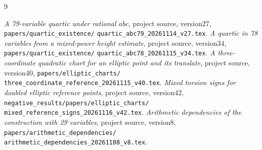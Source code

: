\documentclass[11pt,a4paper]{article}
\begin{document}
\begin{thebibliography}{9}
\raggedright
{}\emph{A 79-variable quartic under rational $abc$},
project source, version27,
\texttt{papers/quartic\_existence/}\allowbreak
\texttt{quartic\_abc79\_20261114\_v27.tex}.
\emph{A quartic in 78 variables from a mixed-power height estimate},
project source, version34,
\texttt{papers/quartic\_existence/}\allowbreak
\texttt{quartic\_abc78\_20261115\_v34.tex}.
\emph{A three-coordinate quadratic chart for an elliptic point and its translate},
project source, version40,
\texttt{papers/elliptic\_charts/}\allowbreak
\texttt{three\_coordinate\_reference\_20261115\_v40.tex}.
\emph{Mixed torsion signs for doubled elliptic reference points},
project source, version42,
\texttt{negative\_results/papers/elliptic\_charts/}\allowbreak
\texttt{mixed\_reference\_signs\_20261116\_v42.tex}.
\emph{Arithmetic dependencies of the construction with 29 variables},
project source, version8,
\texttt{papers/arithmetic\_dependencies/}\allowbreak
\texttt{arithmetic\_dependencies\_20261108\_v8.tex}.
\end{thebibliography}
\end{document}
